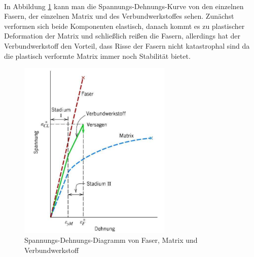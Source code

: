 \documentclass[11pt,a4paper]{article}
\numberwithin{equation}{section}
\numberwithin{figure}{section}
\begin{document}
\\
\begin{addmargin}[25pt]{0pt}
In Abbildung \ref{fig:Faser_Spannung_Dehnung} kann man die Spannungs-Dehnungs-Kurve von den einzelnen Fasern, der einzelnen Matrix und des Verbundwerkstoffes sehen. Zunächst verformen sich beide Komponenten elastisch, danach kommt es zu plastischer Deformation der Matrix und schließlich reißen die Fasern, allerdings hat der Verbundwerkstoff den Vorteil, dass Risse der Fasern nicht katastrophal sind da die plastisch verformte Matrix immer noch Stabilität bietet.  \\ 
\begin{figure}[h]
    \centering
    \includegraphics[width = 0.65\textwidth]{images/Materialwissenschaften/Faser_spannung-Dehnung.png}
    \caption{Spannungs-Dehnungs-Diagramm von Faser, Matrix und Verbundwerkstoff}
    \label{fig:Faser_Spannung_Dehnung}
\end{figure}
\end{addmargin}
\end{document}
